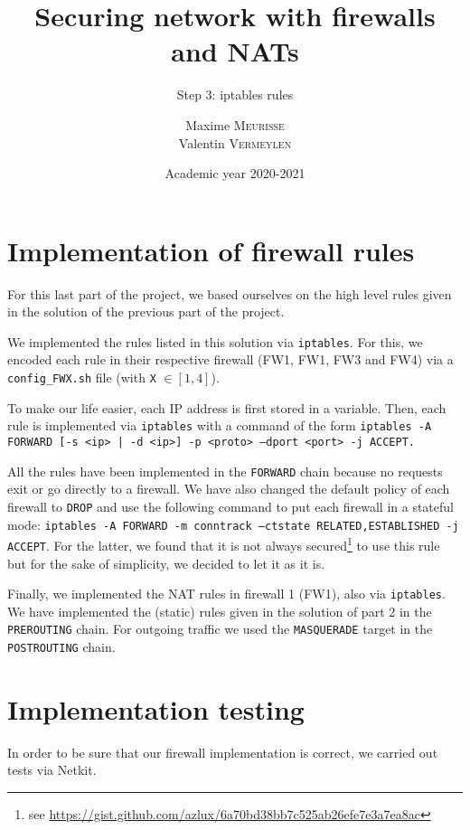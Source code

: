 \documentclass[a4paper, 12pt]{article}
\institute{University of Liège}
\title{Securing network with firewalls and NATs}
\subtitle{Step 3: iptables rules}
\author{Maxime \textsc{Meurisse}\\Valentin \textsc{Vermeylen}}
\date{Academic year 2020-2021}
\begin{document}
    \maketitle
    
    \section{Implementation of firewall rules}
    
    For this last part of the project, we based ourselves on the high level rules given in the solution of the previous part of the project.

    We implemented the rules listed in this solution via \texttt{iptables}. For this, we encoded each rule in their respective firewall (FW1, FW1, FW3 and FW4) via a \texttt{config\_FWX.sh} file (with \texttt{X} $\in [1, 4]$).

    To make our life easier, each IP address is first stored in a variable. Then, each rule is implemented via \texttt{iptables} with a command of the form \texttt{iptables -A FORWARD [-s <ip> | -d <ip>] -p <proto> ---dport <port> -j ACCEPT.}

    All the rules have been implemented in the \texttt{FORWARD} chain because no requests exit or go directly to a firewall. We have also changed the default policy of each firewall to \texttt{DROP} and use the following command to put each firewall in a stateful mode: \texttt{iptables -A FORWARD -m conntrack ---ctstate RELATED,ESTABLISHED -j ACCEPT}. For the latter, we found that it is not always secured\footnote{see \url{https://gist.github.com/azlux/6a70bd38bb7c525ab26efe7e3a7ea8ac}} to use this rule but for the sake of simplicity, we decided to let it as it is.

    Finally, we implemented the NAT rules in firewall 1 (FW1), also via \texttt{iptables}. We have implemented the (static) rules given in the solution of part 2 in the \texttt{PREROUTING} chain. For outgoing traffic we used the \texttt{MASQUERADE} target in the \texttt{POSTROUTING} chain.
    
    \section{Implementation testing}
    
    In order to be sure that our firewall implementation is correct, we carried out tests via Netkit.
    
\end{document}
